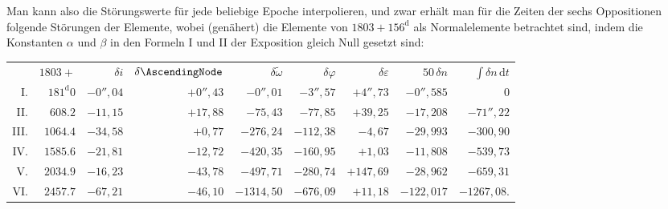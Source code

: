 \par
Man kann also die Störungswerte für jede beliebige Epoche interpolieren, und zwar erhält man für die Zeiten der sechs Oppositionen folgende Störungen der Elemente, wobei (genähert) die Elemente von \(1803+156^{\mathrm d}\) als Normalelemente betrachtet sind, indem die Konstanten \(\alpha\) und \(\beta\) in den Formeln I und II der Exposition gleich Null gesetzt sind:
\begin{landscape}
\begingroup
\fontsize{9}{11}\selectfont
\setlength{\tabcolsep}{4pt}
\begin{center}
\begin{tabular}{@{}rr|r|r|r|r|r|r|r@{}}
 & \(1803+\) & \(\delta i\) & \(\delta\AscendingNode\) & \(\delta\tilde\omega\) & \(\delta\varphi\) & \(\delta\varepsilon\) & \(50\,\delta n\) & \(\int \delta n\,\mathrm{d}t\)\\[4pt]
I. & \(181^{\mathrm d}0\) & \(-0'',\!04\) & \(+0'',\!43\) & \(-0'',\!01\) & \(-3'',\!57\) & \(+4'',\!73\) & \(-0'',\!585\) & \(0\)\\[4pt]
II. & \(608.2\) & \(-11,15\) & \(+17,88\) & \(-75,43\) & \(-77,85\) & \(+39,25\) & \(-17,208\) & \(-71'',\!22\)\\[4pt]
III. & \(1064.4\) & \(-34,58\) & \(+0,77\) & \(-276,24\) & \(-112,38\) & \(-4,67\) & \(-29,993\) & \(-300,90\)\\[4pt]
IV. & \(1585.6\) & \(-21,81\) & \(-12,72\) & \(-420,35\) & \(-160,95\) & \(+1,03\) & \(-11,808\) & \(-539,73\)\\[4pt]
V. & \(2034.9\) & \(-16,23\) & \(-43,78\) & \(-497,71\) & \(-280,74\) & \(+147,69\) & \(-28,962\) & \(-659,31\)\\[4pt]
VI. & \(2457.7\) & \(-67,21\) & \(-46,10\) & \(-1314,50\) & \(-676,09\) & \(+11,18\) & \(-122,017\) & \(-1267,08\text{.}\)\\[4pt]
\end{tabular}
\end{center}
\endgroup
\end{landscape}
